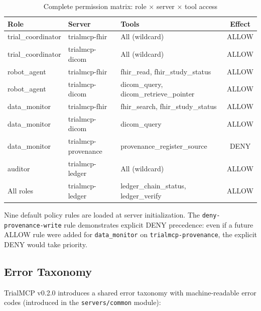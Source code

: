 \documentclass[10pt,letterpaper]{article}
\begin{document}
\begin{table}[H]
\centering
\caption{Complete permission matrix: role $\times$ server $\times$ tool access}
\label{tab:perms}
\small
\begin{tabularx}{\textwidth}{l l l c}
\toprule
\textbf{Role} & \textbf{Server} & \textbf{Tools} & \textbf{Effect} \\
\midrule
trial\_coordinator & trialmcp-fhir & All (wildcard) & ALLOW \\
trial\_coordinator & trialmcp-dicom & All (wildcard) & ALLOW \\
robot\_agent & trialmcp-fhir & fhir\_read, fhir\_study\_status & ALLOW \\
robot\_agent & trialmcp-dicom & dicom\_query, dicom\_retrieve\_pointer & ALLOW \\
data\_monitor & trialmcp-fhir & fhir\_search, fhir\_study\_status & ALLOW \\
data\_monitor & trialmcp-dicom & dicom\_query & ALLOW \\
data\_monitor & trialmcp-provenance & provenance\_register\_source & DENY \\
auditor & trialmcp-ledger & All (wildcard) & ALLOW \\
All roles & trialmcp-ledger & ledger\_chain\_status, ledger\_verify & ALLOW \\
\bottomrule
\end{tabularx}
\end{table}

Nine default policy rules are loaded at server initialization. The \texttt{deny-provenance-write} rule demonstrates explicit DENY precedence: even if a future ALLOW rule were added for \texttt{data\_monitor} on \texttt{trialmcp-provenance}, the explicit DENY would take priority.

\subsection{Error Taxonomy}

TrialMCP v0.2.0 introduces a shared error taxonomy with machine-readable error codes (introduced in the \texttt{servers/common} module):
\end{document}
